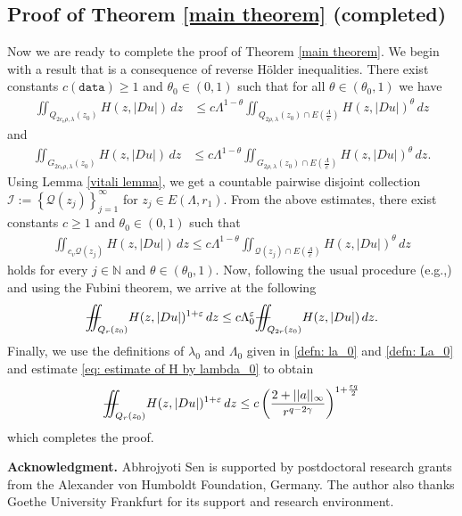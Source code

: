\documentclass[notitlepage,11pt,reqno]{amsart}
\theoremstyle{definition}
\numberwithin{equation}{section}
\newcommand{\La}{\Lambda}
\newcommand{\NN}{\mathds{N}}
\newcommand{\iintss}{{\int\hspace{-0.28cm}\int}}
\newcommand{ \miints }{{\iintss\hspace{-0.56cm} -\hspace{-0.15cm}-}}
\newcommand{\miint}[1]{{\miints_{\hspace{-0.13cm}#1}}}
\begin{document}
\subsection{Proof of Theorem \ref{main theorem} (completed)} Now we are ready to complete the proof of Theorem \ref{main theorem}. We begin with a result that is a consequence of reverse H\"{o}lder inequalities. There exist constants $c (\texttt{data})\geq 1$ and $\theta_0\in (0, 1)$ such that for all $\theta \in (\theta_0, 1)$ we have
\begin{align*}
\iint_{Q_{2c_v\rho, \lambda}(z_0)}H(z, |Du|)\, dz &\leq c\Lambda^{1-\theta}\iint_{Q_{2\rho, \lambda}(z_0) \cap E\left(\frac{\Lambda}{c}\right)} H(z, |D u|)^{\theta}\, dz
\end{align*}   
and 
\begin{align*}
  \iint_{G_{2c_v\rho, \lambda}(z_0)}H(z, |Du|)\, dz &\leq c\Lambda^{1-\theta}\iint_{G_{2\rho, \lambda}(z_0) \cap E\left(\frac{\Lambda}{c}\right)} H(z, |D u
  |)^{\theta}\, dz.
\end{align*}
Using Lemma \ref{vitali lemma}, we get a countable pairwise disjoint collection $\mathcal{I}:=\left\{\mathcal{Q}({z_j})\right\}_{j=1}^{\infty}$ for $z_j \in E\left({\Lambda, r_1}\right).$ From the above estimates, there exist constants $c \geq 1$ and $\theta_0\in (0,1)$ such that
\begin{align*}
    \iint_{c_v \mathcal{Q}(z_j)} H(z, |D u|)\, dz \leq c\Lambda^{1-\theta}\iint_{\mathcal{Q}(z_j) \cap E\left({\frac{\Lambda}{c}}\right)}H(z, |Du|)^{\theta}\, dz
\end{align*}
holds for every $j \in \NN$ and $\theta \in (\theta_0, 1).$ Now, following the usual procedure (e.g.,\cite[Section 5]{2023_Gradient_Higher_Integrability_for_Degenerate_Parabolic_Double-Phase_Systems}) and using the Fubini theorem, we arrive at the following
\begin{align*}
    \miint{Q_r(z_0)}H(z, |Du|)^{1+\varepsilon}\, dz\leq c \La^{\varepsilon}_0\miint{Q_{2r}(z_0)}H(z, |Du|)\, dz.
\end{align*}
Finally, we use the definitions of $\lambda_0$ and $\Lambda_0$ given in \eqref{defn: la_0} and \eqref{defn: La_0} and estimate \eqref{eq: estimate of H by lambda_0} to obtain
\begin{align*}
  \miint{Q_r(z_0)}H(z, |Du|)^{1+\varepsilon}\, dz\leq c \left(\frac{2+||a||_{\infty}}{r^{q-2\gamma}}\right)^{1+\frac{\varepsilon q}{2}}   
\end{align*}
which completes the proof.


\bigskip 
\noindent\textbf{Acknowledgment.}
Abhrojyoti Sen is supported by postdoctoral research grants from the Alexander von Humboldt Foundation, Germany. The author also thanks Goethe University Frankfurt for its support and research environment.
\end{document}
